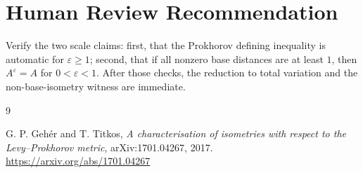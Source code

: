 \documentclass[11pt]{article}
\begin{document}
\section*{Human Review Recommendation}

Verify the two scale claims: first, that the Prokhorov defining inequality is
automatic for \(\varepsilon\ge1\); second, that if all nonzero base distances
are at least \(1\), then \(A^\varepsilon=A\) for \(0<\varepsilon<1\).  After
those checks, the reduction to total variation and the non-base-isometry
witness are immediate.

\begin{thebibliography}{9}

G. P. Geh\'er and T. Titkos,
\emph{A characterisation of isometries with respect to the Levy--Prokhorov metric},
arXiv:1701.04267, 2017.
\url{https://arxiv.org/abs/1701.04267}

\end{thebibliography}
\end{document}

